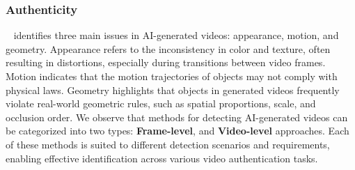 \subsubsection{\textbf{Authenticity}}
~\cite{chang2024matters} identifies three main issues in AI-generated videos: appearance, motion, and geometry. Appearance refers to the inconsistency in color and texture, often resulting in distortions, especially during transitions between video frames. Motion indicates that the motion trajectories of objects may not comply with physical laws. Geometry highlights that objects in generated videos frequently violate real-world geometric rules, such as spatial proportions, scale, and occlusion order. We observe that methods for detecting AI-generated videos can be categorized into two types: \textbf{Frame-level}, and \textbf{Video-level} approaches. Each of these methods is suited to different detection scenarios and requirements, enabling effective identification across various video authentication tasks.

